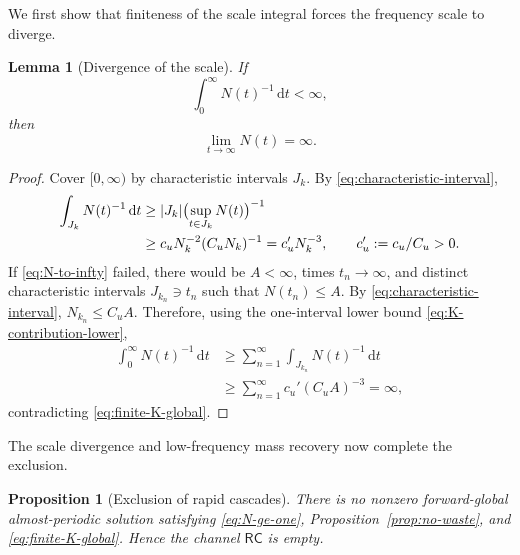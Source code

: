 \documentclass{interact}
\numberwithin{equation}{section}
\theoremstyle{plain}
\newtheorem{proposition}[theorem]{Proposition}
\newtheorem{lemma}[theorem]{Lemma}
\theoremstyle{definition}
\theoremstyle{remark}
\newcommand{\dd}{\,\mathrm d}
\begin{document}
We first show that finiteness of the scale integral forces the frequency scale to diverge.

\begin{lemma}[Divergence of the scale]\label{lem:N-to-infty}
If
\begin{equation}\label{eq:finite-K-global}
 \int_0^\infty N(t)^{-1}\dd t<\infty,
\end{equation}
then
\begin{equation}\label{eq:N-to-infty}
 \lim_{t\to\infty}N(t)=\infty.
\end{equation}
\end{lemma}

\begin{proof}
Cover $[0,\infty)$ by characteristic intervals $J_k$. By \eqref{eq:characteristic-interval},
\begin{align}
 \int_{J_k}N(t)^{-1}\dd t
 &\ge |J_k|\bigl(\sup_{t\in J_k}N(t)\bigr)^{-1}\notag\\
 &\ge c_uN_k^{-2}(C_uN_k)^{-1}
 =c_u'N_k^{-3},
 \qquad c_u':=c_u/C_u>0.
 \label{eq:K-contribution-lower}
\end{align}
If \eqref{eq:N-to-infty} failed, there would be $A<\infty$, times $t_n\to\infty$, and distinct characteristic intervals $J_{k_n}\ni t_n$ such that $N(t_n)\le A$. By \eqref{eq:characteristic-interval}, $N_{k_n}\le C_uA$. Therefore, using the one-interval lower bound \eqref{eq:K-contribution-lower},
\begin{align*}
 \int_0^\infty N(t)^{-1}\dd t
 &\ge\sum_{n=1}^\infty\int_{J_{k_n}}N(t)^{-1}\dd t\\
 &\ge\sum_{n=1}^\infty c_u'(C_uA)^{-3}=\infty,
\end{align*}
contradicting \eqref{eq:finite-K-global}.
\end{proof}

The scale divergence and low-frequency mass recovery now complete the exclusion.

\begin{proposition}[Exclusion of rapid cascades]\label{prop:rapid-cascade-exclusion}
There is no nonzero forward-global almost-periodic solution satisfying \eqref{eq:N-ge-one}, Proposition~\ref{prop:no-waste}, and \eqref{eq:finite-K-global}. Hence the channel $\mathsf{RC}$ is empty.
\end{proposition}
\end{document}
